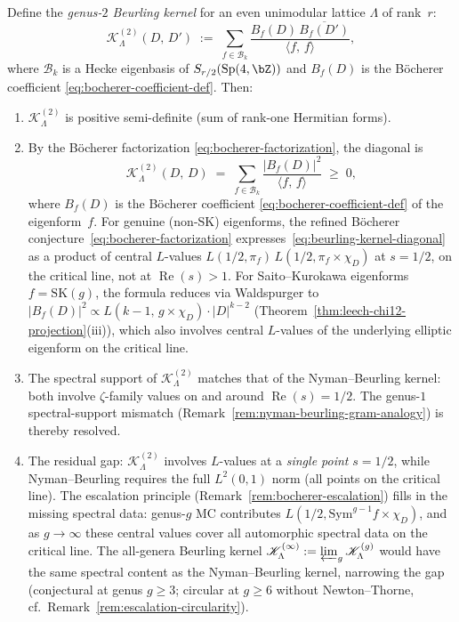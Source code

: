 \begin{remark}
Define the \emph{genus-$2$ Beurling kernel} for an even
unimodular lattice $\Lambda$ of rank~$r$:
\begin{equation}\label{eq:genus2-beurling-kernel}
\mathscr{K}_\Lambda^{(2)}(D,\,D')
\;:=\;
\sum_{f \in \mathscr{B}_k}
\frac{B_f(D)\,\overline{B_f(D')}}
{\langle f,\, f \rangle},
\end{equation}
where $\mathscr{B}_k$ is a Hecke eigenbasis of
$S_{r/2}(\mathrm{Sp}(4,\bZ))$ and
$B_f(D)$ is the B\"ocherer coefficient
\eqref{eq:bocherer-coefficient-def}.
Then:
\begin{enumerate}[label=\textup{(\roman*)}]
\item
$\mathscr{K}_\Lambda^{(2)}$ is positive semi-definite
(sum of rank-one Hermitian forms).
\item
By the B\"ocherer factorization
\eqref{eq:bocherer-factorization}, the diagonal is
\begin{equation}\label{eq:beurling-kernel-diagonal}
\mathscr{K}_\Lambda^{(2)}(D,\,D)
\;=\;
\sum_{f \in \mathscr{B}_k}
\frac{\lvert B_f(D)\rvert^2}
{\langle f,\, f \rangle}
\;\geq\; 0,
\end{equation}
where $B_f(D)$ is the B\"ocherer coefficient
\eqref{eq:bocherer-coefficient-def} of the eigenform~$f$.
For genuine \textup{(}non-SK\textup{)} eigenforms, the
refined B\"ocherer conjecture~\eqref{eq:bocherer-factorization}
expresses~\eqref{eq:beurling-kernel-diagonal} as a product
of central $L$-values $L(1/2,\pi_f)\,L(1/2,\pi_f\times\chi_D)$
at $s = 1/2$, on the critical line, not at
$\operatorname{Re}(s) > 1$.
For Saito--Kurokawa eigenforms $f = \mathrm{SK}(g)$,
the formula reduces via Waldspurger to
$\lvert B_f(D)\rvert^2 \propto L(k{-}1,\, g \times \chi_D)
\cdot \lvert D\rvert^{k-2}$
\textup{(}Theorem~\textup{\ref{thm:leech-chi12-projection}(iii)}\textup{)},
which also involves central $L$-values of the underlying
elliptic eigenform on the critical line.
\item
The spectral support of $\mathscr{K}_\Lambda^{(2)}$
matches that of the Nyman--Beurling kernel: both involve
$\zeta$-family values on and around $\operatorname{Re}(s)
= 1/2$. The genus-$1$ spectral-support mismatch
\textup{(}Remark~\ref{rem:nyman-beurling-gram-analogy}\textup{)}
is thereby resolved.
\item
The residual gap:
$\mathscr{K}_\Lambda^{(2)}$ involves $L$-values at a
\emph{single point} $s = 1/2$, while Nyman--Beurling
requires the full $L^2(0,1)$ norm (all points on the
critical line).
The escalation principle
(Remark~\ref{rem:bocherer-escalation})
fills in the missing spectral data: genus-$g$ MC
contributes
$L(1/2, \mathrm{Sym}^{g-1} f \times \chi_D)$,
and as $g \to \infty$ these central values cover all
automorphic spectral data on the critical line.
The all-genera Beurling kernel
$\mathscr{K}_\Lambda^{(\infty)} := \varprojlim_g
\mathscr{K}_\Lambda^{(g)}$
would have the same spectral content as the
Nyman--Beurling kernel, narrowing the gap
\textup{(}conjectural at genus $g \geq 3$;
circular at $g \geq 6$ without Newton--Thorne,
cf.\ Remark~\textup{\ref{rem:escalation-circularity}}\textup{)}.
\end{enumerate}
\end{remark}

